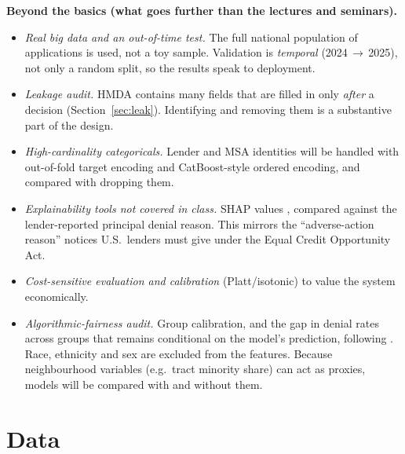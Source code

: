 \documentclass[11pt,a4paper]{article}
\begin{document}
\textbf{Beyond the basics (what goes further than the lectures and seminars).}
\begin{itemize}
  \item \emph{Real big data and an out-of-time test.} The full national population of
  applications is used, not a toy sample. Validation is \emph{temporal}
  (2024\,$\rightarrow$\,2025), not only a random split, so the results speak to deployment.
  \item \emph{Leakage audit.} HMDA contains many fields that are filled in only
  \emph{after} a decision (Section~\ref{sec:leak}). Identifying and removing them is a
  substantive part of the design.
  \item \emph{High-cardinality categoricals.} Lender and MSA identities will be
  handled with out-of-fold target encoding and CatBoost-style ordered encoding, and
  compared with dropping them.
  \item \emph{Explainability tools not covered in class.} SHAP values
  \cite{lundberg2017}, compared against the lender-reported principal denial reason.
  This mirrors the ``adverse-action reason'' notices U.S.\ lenders must give under
  the Equal Credit Opportunity Act.
  \item \emph{Cost-sensitive evaluation and calibration} (Platt/isotonic) to value
  the system economically.
  \item \emph{Algorithmic-fairness audit.} Group calibration, and the gap in
  denial rates across groups that remains conditional on the model's prediction,
  following \cite{fuster2022}. Race, ethnicity and sex are excluded from the
  features. Because neighbourhood variables (e.g.\ tract minority share) can act as
  proxies, models will be compared with and without them.
\end{itemize}

\section{Data}
\end{document}
